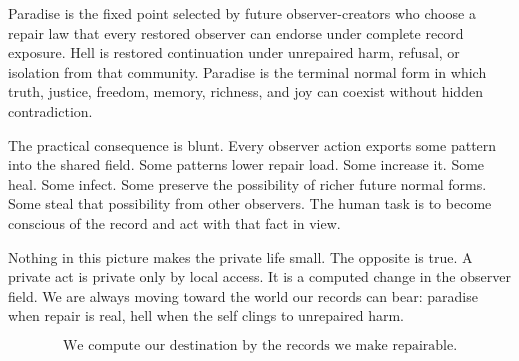 \documentclass[11pt]{article}
\theoremstyle{remark}
\theoremstyle{plain}
\begin{document}
Paradise is the fixed point selected by future observer-creators who choose a
repair law that every restored observer can endorse under complete record
exposure. Hell is restored continuation under unrepaired harm, refusal, or
isolation from that community. Paradise is the terminal normal form in which
truth, justice, freedom, memory, richness, and joy can coexist without hidden
contradiction.

The practical consequence is blunt. Every observer action exports
some pattern into the shared field. Some patterns lower repair load. Some
increase it. Some heal. Some infect. Some preserve the possibility of richer
future normal forms. Some steal that possibility from other observers. The
human task is to become conscious of the record and act with that fact in view.

Nothing in this picture makes the private life small. The opposite is true. A
private act is private only by local access. It is a computed change in
the observer field. We are always moving toward the world our records can bear:
paradise when repair is real, hell when the self clings to unrepaired harm.

\[
\boxed{
\text{We compute our destination by the records we make repairable.}
}
\]
\end{document}
